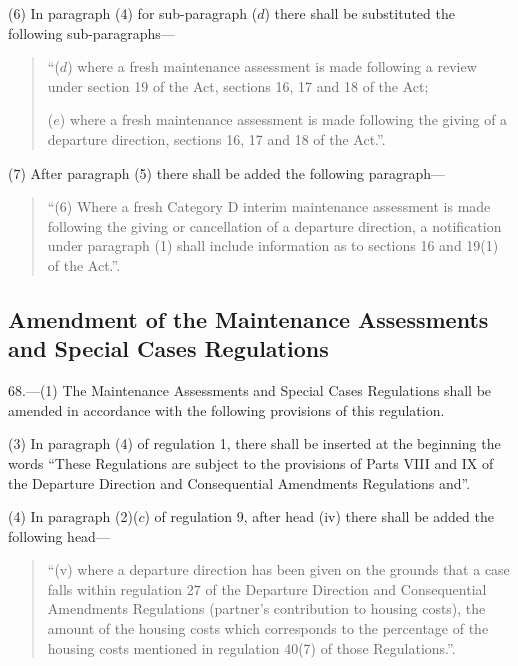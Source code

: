 \documentclass[12pt,a4paper]{article}
\begin{document}
(6) In paragraph (4) for sub-paragraph ($d$) there shall be substituted the
following sub-paragraphs—
\begin{quotation}
“($d$) where a fresh maintenance assessment is made following a review under
section 19 of the Act, sections 16, 17 and 18 of the Act;

($e$) where a fresh maintenance assessment is made following the giving of a
departure direction, sections 16, 17 and 18 of the Act.”.
\end{quotation}

(7) After paragraph (5) there shall be added the following paragraph—
\begin{quotation}
“(6) Where a fresh Category D interim maintenance assessment is made following
the giving or cancellation of a departure direction, a notification under
paragraph (1) shall include information as to sections 16 and 19(1) of the
Act.”.
\end{quotation}

\subsection[68. Amendment of the Maintenance Assessments and Special Cases Regulations]{\sloppy Amendment of the Maintenance Assessments and Special Cases Regulations}

68.—(1)
The Maintenance Assessments and Special Cases Regulations shall be amended in
accordance with the following provisions of this regulation.



(3) In paragraph (4) of regulation 1, there shall be inserted at the beginning
the words “These Regulations are subject to the provisions of Parts VIII and IX
of the Departure Direction and Consequential Amendments Regulations and”.

(4) In paragraph (2)($c$) of regulation 9, after head (iv) there shall be added
the following head—
\begin{quotation}
“(v) where a departure direction has been given on the grounds that a case falls
within regulation 27 of the Departure Direction and Consequential Amendments
Regulations (partner’s contribution to housing costs), the amount of the housing
costs which corresponds to the percentage of the housing costs mentioned in
regulation 40(7) of those Regulations.”.
\end{quotation}
\end{document}
